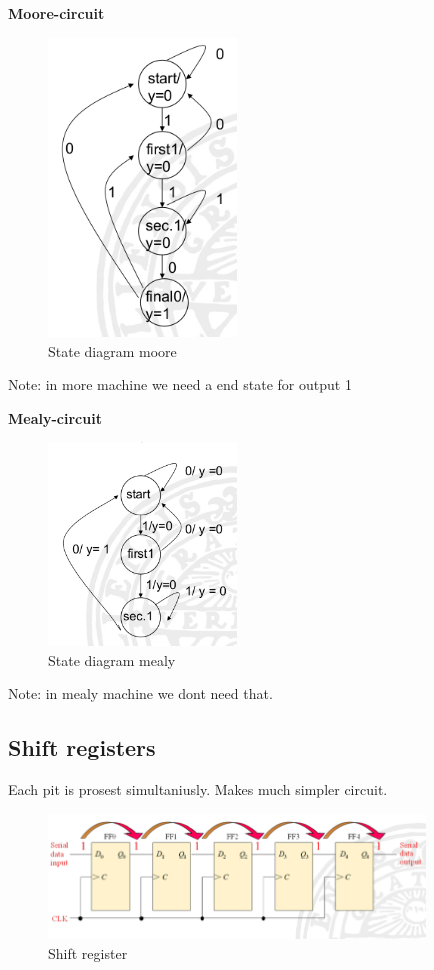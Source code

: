 \documentclass{article}
\begin{document}
\newpage
\textbf{Moore-circuit}  
\begin{figure}[h]
    \centering
    \includegraphics[width=5cm]{image/state-diagram-moore.png}
    \caption{State diagram moore}
\end{figure}
Note: in more machine we need a end state for output 1

\textbf{Mealy-circuit}  
\begin{figure}[h]
    \centering
    \includegraphics[width=5cm]{image/state-diagram-mealy.png}
    \caption{State diagram mealy}
\end{figure}
Note: in mealy machine we dont need that.





\newpage
\subsection{Shift registers}
Each pit is prosest simultaniusly. Makes much simpler circuit.
\begin{figure}[h]
    \centering
    \includegraphics[width=10cm]{image/shift-register.png}
    \caption{Shift register}
\end{figure}
\end{document}
